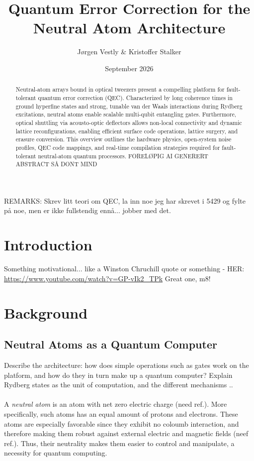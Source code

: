 \documentclass[amssymb,twocolumn,aps]{revtex4-2}
\begin{document}
\title{Quantum Error Correction for the Neutral Atom Architecture}
\author{Jørgen Vestly \& Kristoffer Stalker}
\date{September 2026}
\begin{abstract}
      Neutral-atom arrays bound in optical tweezers present a compelling platform for fault-tolerant quantum error correction (QEC). Characterized by long coherence times in ground hyperfine states and strong, tunable van der Waals interactions during Rydberg excitations, neutral atoms enable scalable multi-qubit entangling gates. Furthermore, optical shuttling via acousto-optic deflectors allows non-local connectivity and dynamic lattice reconfigurations, enabling efficient surface code operations, lattice surgery, and erasure conversion. This overview outlines the hardware physics, open-system noise profiles, QEC code mappings, and real-time compilation strategies required for fault-tolerant neutral-atom quantum processors. FORELØPIG AI GENERERT ABSTRACT SÅ DONT MIND
\end{abstract}
\vspace{1.5em}
\maketitle
REMARKS: Skrev litt teori om QEC, la inn noe jeg har skrevet i 5429 og fylte på noe, men er ikke fullstendig ennå... jobber med det.
\section{Introduction}
Something motivational... like a Winston Chruchill quote or something - HER: \url{https://www.youtube.com/watch?v=GP-vIk2_TPk} Great one, m8!
\section{Background}
\subsection{Neutral Atoms as a Quantum Computer}
Describe the architecture: how does simple operations such as gates work on the platform, and how do they in turn make up a quantum computer? Explain Rydberg states as the unit of computation, and the different mechanisms ..\\\\
A \textit{neutral atom} is an atom with net zero electric charge (need ref.). More specifically, such atoms has an equal amount of protons and electrons. These atoms are especially favorable since they exhibit no coloumb interaction, and therefore making them robust against external electric and magnetic fields (neef ref.). Thus, their neutrality makes them easier to control and manipulate, a necessity for quantum computing.
\end{document}
